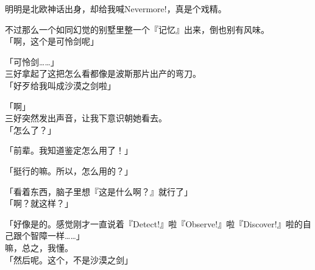 明明是北欧神话出身，却给我喊Nevermore!，真是个戏精。

不过那么一个如同幻觉的别墅里整一个『记忆』出来，倒也别有风味。\\

「啊，这个是可怜剑呢」

「可怜剑……」\\

三好拿起了这把怎么看都像是波斯那片出产的弯刀。\\

「好歹给我叫成沙漠之剑啦」

「啊」\\

三好突然发出声音，让我下意识朝她看去。\\

「怎么了？」

「前辈。我知道鉴定怎么用了！」

「挺行的嘛。所以，怎么用的？」

「看着东西，脑子里想『这是什么啊？』就行了」\\

「啊？就这样？」

「好像是的。感觉刚才一直说着『Detect!』啦『Observe!』啦『Discover!』啦的自己跟个智障一样……」\\

嘛，总之，我懂。\\

「然后呢。这个，不是沙漠之剑」

